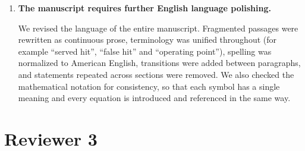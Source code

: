 \documentclass[11pt]{article}
\begin{document}
\begin{enumerate}[leftmargin=*, itemsep=1.2em]
\item \textbf{The manuscript requires further English language polishing.}

We revised the language of the entire manuscript. Fragmented passages were rewritten as continuous prose, terminology was unified throughout (for example ``served hit'', ``false hit'' and ``operating point''), spelling was normalized to American English, transitions were added between paragraphs, and statements repeated across sections were removed. We also checked the mathematical notation for consistency, so that each symbol has a single meaning and every equation is introduced and referenced in the same way.

\end{enumerate}

\section*{Reviewer 3}
\end{document}
